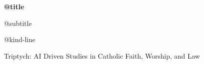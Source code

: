 




\hypersetup{pageanchor=false}
\begin{titlepage}
  \thispagestyle{empty}
  \centering
  \vspace*{0.12\textheight}
  {\Huge\bfseries @{title}\par}
  \vspace{0.9em}
  {\Large @{subtitle}\par}
  \vspace{1.6em}
  {\large @{kind-line}\par}
  \vfill
  {\small Triptych: AI Driven Studies in Catholic Faith, Worship, and Law\par}
\end{titlepage}

\begingroup
\small
\setlength{\parskip}{0pt}
\tableofcontents
\endgroup
\clearpage
{}
\hypersetup{pageanchor=true}

\begin{deepstudy}
\appendix
\end{deepstudy}


